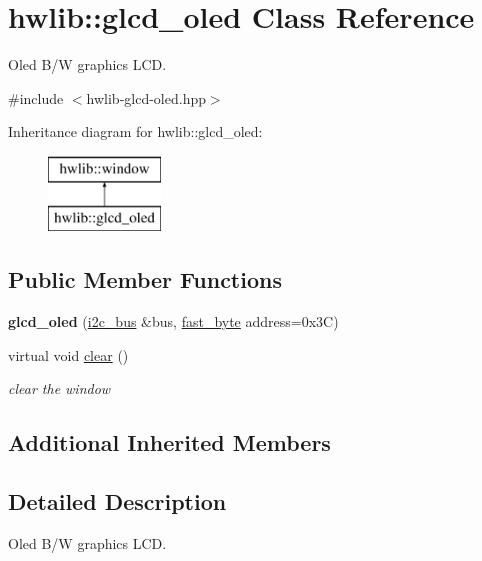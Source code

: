 \hypertarget{classhwlib_1_1glcd__oled}{}\section{hwlib\+:\+:glcd\+\_\+oled Class Reference}
\label{classhwlib_1_1glcd__oled}


Oled B/W graphics L\+CD.  




{\ttfamily \#include $<$hwlib-\/glcd-\/oled.\+hpp$>$}

Inheritance diagram for hwlib\+:\+:glcd\+\_\+oled\+:\begin{figure}[H]
\begin{center}
\leavevmode
\includegraphics[height=2.000000cm]{classhwlib_1_1glcd__oled}
\end{center}
\end{figure}
\subsection*{Public Member Functions}
\begin{DoxyCompactItemize}
\item 
{\bfseries glcd\+\_\+oled} (\hyperlink{classhwlib_1_1i2c__bus}{i2c\+\_\+bus} \&bus, \hyperlink{hwlib-defines_8hpp_a54998f25522db04b7b797b0fcc9eb3d5}{fast\+\_\+byte} address=0x3\+C)\hypertarget{classhwlib_1_1glcd__oled_acc1ace8bf824e79371c7fc6d5642cbf3}{}\label{classhwlib_1_1glcd__oled_acc1ace8bf824e79371c7fc6d5642cbf3}

\item 
virtual void \hyperlink{classhwlib_1_1glcd__oled_a4d3734f822d7f814be2630538cc49911}{clear} ()
\begin{DoxyCompactList}\small\item\em clear the window \end{DoxyCompactList}\end{DoxyCompactItemize}
\subsection*{Additional Inherited Members}


\subsection{Detailed Description}
Oled B/W graphics L\+CD. 

